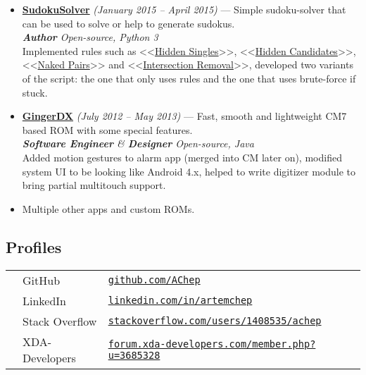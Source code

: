 \documentclass[a4paper]{article}
\begin{document}
\begin{itemize}
		\item \href{https://github.com/AChep/SudokuSolver}{\textbf{SudokuSolver}} \textit{(January 2015 -- April 2015)} --- Simple sudoku-solver that can be used to solve or help to generate sudokus. \\[0.2em]
		{\footnotesize \textit{\textbf{Author} \hfill Open-source, Python 3}} \\[0.2em]
		Implemented rules such as <<\href{http://www.sudokuwiki.org/Getting_Started}{Hidden Singles}>>, <<\href{http://www.sudokuwiki.org/Hidden_Candidates}{Hidden Candidates}>>, <<\href{http://www.sudokuwiki.org/Naked_Candidates#NP}{Naked Pairs}>> and <<\href{http://www.sudokuwiki.org/intersection_removal}{Intersection Removal}>>, developed two variants of the script: the one that only uses rules and the one that uses brute-force if stuck.
		
		\item \href{https://forum.xda-developers.com/showthread.php?t=1188486}{\textbf{GingerDX}} \textit{(July 2012 -- May 2013)} --- Fast, smooth and lightweight CM7 based ROM with some special features. \\[0.2em]
		{\footnotesize \textit{\textbf{Software Engineer} \& \textbf{Designer} \hfill Open-source, Java}} \\[0.2em] 
		Added motion gestures to alarm app (merged into CM later on), modified system UI to be looking like Android 4.x, helped to write digitizer module to bring partial multitouch support.  

		\item Multiple other apps and custom ROMs.
	\end{itemize}
	\subsection*{Profiles}
	\begin{tabular}{@{}lll}
		\faGithub & GitHub & \href{https://github.com/AChep}{\texttt{github.com/AChep}} \\
		\faLinkedin & LinkedIn & \href{https://www.linkedin.com/in/artemchep/}{\texttt{linkedin.com/in/artemchep}} \\
		\faStackOverflow & Stack Overflow & \href{https://stackoverflow.com/users/1408535/achep}{\texttt{stackoverflow.com/users/1408535/achep}} \\
		& XDA-Developers & \href{https://forum.xda-developers.com/member.php?u=3685328}{\texttt{forum.xda-developers.com/member.php?u=3685328}} \\
	\end{tabular}
\end{document}

